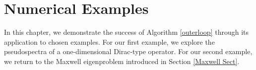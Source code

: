 

\chapter{Numerical Examples}

In this chapter, we demonstrate the success of Algorithm \ref{outerloop} through its application to chosen examples. For our first example, we explore the pseudospectra of a one-dimensional Dirac-type operator. For our second example, we return to the Maxwell eigenproblem 
introduced in Section \eqref{Maxwell Sect}.


